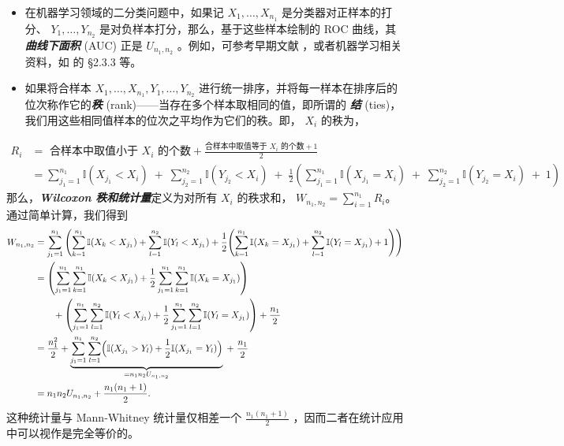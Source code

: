 \begin{remark}

\begin{itemize}
\tightlist
\item
  在机器学习领域的二分类问题中，如果记 $X_1,\dots,X_{n_1}$ 是分类器对正样本的打分、 $Y_1,\dots,Y_{n_2}$ 是对负样本打分，那么，基于这些样本绘制的 ROC 曲线，其\textbf{\emph{曲线下面积}} (AUC) 正是 $U_{n_1,n_2}$ 。例如，可参考早期文献 \cite{bamber1975}，或者机器学习相关资料，如 \cite{zhouzhihua2016} 的 §2.3.3 等。
\end{itemize}


\begin{itemize}
\tightlist
\item
  如果将合样本 $X_1,\dots,X_{n_1},Y_1,\dots,Y_{n_2}$ 进行统一排序，并将每一样本在排序后的位次称作它的\textbf{\emph{秩 }}(rank)------当存在多个样本取相同的值，即所谓的 \textbf{\emph{结}} (ties)，我们用这些相同值样本的位次之平均作为它们的秩。即， $X_i$ 的秩为，
\end{itemize}
\[\begin{aligned} R_i &=\text{ 合样本中取值小于 $X_i$ 的个数} + \frac{\text{合样本中取值等于 $X_i$ 的个数} +1}2  \\&= \sum_{j_1=1}^{n_1} \mathbb{I}(X_{j_1} < X_i) \;+\; \sum_{j_2=1}^{n_2} \mathbb{I}(Y_{j_2} < X_i) \;+\; \frac{1}{2}\left( \sum_{j_1=1}^{n_1} \mathbb{I}(X_{j_1} = X_i) \;+\; \sum_{j_2=1}^{n_2} \mathbb{I}(Y_{j_2} = X_i) \;+\; 1 \right) \end{aligned}\]
那么，\textbf{\emph{Wilcoxon 秩和统计量}}定义为对所有 $X_i$ 的秩求和， $W_{n_1,n_2}=\sum_{i=1}^{n_1}R_i$。通过简单计算，我们得到\[\begin{aligned} W_{n_1,n_2} &= \sum_{j_1=1}^{n_1} \left( \sum_{k=1}^{n_1}\mathbb I(X_k<X_{j_1})+\sum_{l=1}^{n_2}\mathbb I(Y_l<X_{j_1})+\frac12\Biggl(\sum_{k=1}^{n_1}\mathbb I(X_k=X_{j_1})+\sum_{l=1}^{n_2}\mathbb I(Y_l=X_{j_1})+1\Biggr) \right) \\ &= \left(\sum_{j_1=1}^{n_1}\sum_{k=1}^{n_1}\mathbb I(X_k<X_{j_1})+\frac12\sum_{j_1=1}^{n_1}\sum_{k=1}^{n_1}\mathbb I(X_k=X_{j_1})\right) \\ &\qquad + \left(\sum_{j_1=1}^{n_1}\sum_{l=1}^{n_2}\mathbb I(Y_l<X_{j_1})+\frac12\sum_{j_1=1}^{n_1}\sum_{l=1}^{n_2}\mathbb I(Y_l=X_{j_1})\right) + \frac{n_1}{2} \\ &= \frac{n_1^2}{2} + \underbrace{\sum_{j_1=1}^{n_1}\sum_{l=1}^{n_2}\Bigl(\mathbb I(X_{j_1}>Y_l)+\frac12\mathbb I(X_{j_1}=Y_l)\Bigr)}_{=n_1n_2U_{n_1,n_2}} \;+\; \frac{n_1}{2} \\ &= n_1n_2U_{n_1,n_2} + \frac{n_1(n_1+1)}{2}. \end{aligned}\]这种统计量与 Mann‑Whitney 统计量仅相差一个 $\tfrac{n_1(n_1+1)}2$ ，因而二者在统计应用中可以视作是完全等价的。
\end{remark}


